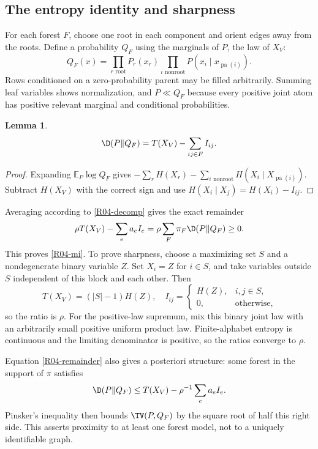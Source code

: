 \documentclass[11pt,a4paper]{article}
\newtheorem{lemma}[theorem]{Lemma}
\theoremstyle{definition}\newtheorem{definition}[theorem]{Definition}
\theoremstyle{remark}\newtheorem{remark}[theorem]{Remark}
\newcommand{\E}{\mathbb E}\newcommand{\one}{\mathbf 1}\newcommand{\1}{\mathbf 1}
\numberwithin{equation}{section}
\begin{document}
\subsection{The entropy identity and sharpness}\label{R04-sec-3}
For each forest $F$, choose one root in each component and orient edges away from the roots. Define a probability $Q_F$ using the marginals of $P$, the law of $X_V$:
\[
Q_F(x)=\prod_{r\text{ root}}P_r(x_r)\prod_{i\text{ nonroot}}P(x_i\mid x_{\operatorname{pa}(i)}).
\]
Rows conditioned on a zero-probability parent may be filled arbitrarily. Summing leaf variables shows normalization, and $P\ll Q_F$ because every positive joint atom has positive relevant marginal and conditional probabilities.
\begin{lemma}\label{R04-kl}
\[
\D(P\Vert Q_F)=T(X_V)-\sum_{ij\in F}I_{ij}.
\]
\end{lemma}
\begin{proof}
Expanding $\E_P\log Q_F$ gives $-\sum_rH(X_r)-\sum_{i\text{ nonroot}}H(X_i\mid X_{\operatorname{pa}(i)})$. Subtract $H(X_V)$ with the correct sign and use $H(X_i\mid X_j)=H(X_i)-I_{ij}$.
\end{proof}
Averaging according to \eqref{R04-decomp} gives the exact remainder
\begin{equation}\label{R04-remainder}
\rho T(X_V)-\sum_ea_eI_e=\rho\sum_F\pi_F\D(P\Vert Q_F)\geq0.
\end{equation}
This proves \eqref{R04-mi}. To prove sharpness, choose a maximizing set $S$ and a nondegenerate binary variable $Z$. Set $X_i=Z$ for $i\in S$, and take variables outside $S$ independent of this block and each other. Then
\[
T(X_V)=(|S|-1)H(Z),\quad
I_{ij}=\begin{cases}H(Z),&i,j\in S,\\0,&\text{otherwise},\end{cases}
\]
so the ratio is $\rho$. For the positive-law supremum, mix this binary joint law with an arbitrarily small positive uniform product law. Finite-alphabet entropy is continuous and the limiting denominator is positive, so the ratios converge to $\rho$.

Equation \eqref{R04-remainder} also gives a posteriori structure: some forest in the support of $\pi$ satisfies
\[
\D(P\Vert Q_F)\leq T(X_V)-\rho^{-1}\sum_ea_eI_e.
\]
Pinsker's inequality then bounds $\TV(P,Q_F)$ by the square root of half this right side. This asserts proximity to at least one forest model, not to a uniquely identifiable graph.
\end{document}
